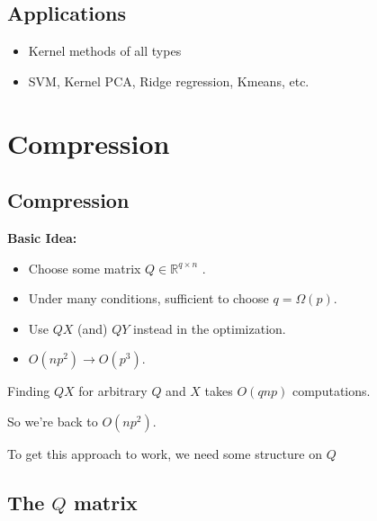 \documentclass[]{article}
\providecommand{\tightlist}{%
  \setlength{\itemsep}{0pt}\setlength{\parskip}{0pt}}
\begin{document}
\hypertarget{applications}{%
\subsection{Applications}\label{applications}}

\begin{itemize}
\tightlist
\item
  Kernel methods of all types
\item
  SVM, Kernel PCA, Ridge regression, Kmeans, etc.
\end{itemize}

\hypertarget{compression}{%
\section{Compression}\label{compression}}

\hypertarget{compression-1}{%
\subsection{Compression}\label{compression-1}}

\textbf{Basic Idea:}

\begin{itemize}
\tightlist
\item
  Choose some matrix \(Q\in\mathbb{R}^{q\times n}\) .
\item
  Under many conditions, sufficient to choose \(q=\Omega(p)\).
\item
  Use \(QX\) (and) \(QY\) instead in the optimization.
\item
  \(O(np^2)\longrightarrow O(p^3)\).
\end{itemize}

Finding \(QX\) for arbitrary \(Q\) and \(X\) takes \(O(qnp)\)
computations.

So we're back to \(O(np^2)\).

To get this approach to work, we need some structure on \(Q\)

\hypertarget{the-q-matrix}{%
\subsection{\texorpdfstring{The \(Q\)
matrix}{The Q matrix}}\label{the-q-matrix}}
\end{document}

